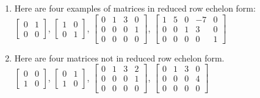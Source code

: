 \documentclass[aima104_lecturenotes_ku.tex]{subfiles}
\begin{document}
\begin{enumerate}
    \item Here are four examples of matrices in reduced row echelon form: \\[2mm]
$\displaystyle \begin{bmatrix}
    0 & 1 \\
    0 & 0
\end{bmatrix}$, \hspace{8mm}
$\displaystyle \begin{bmatrix}
    1 & 0 \\
    0 & 1
\end{bmatrix}$, \hspace{10mm}
$\displaystyle \begin{bmatrix}
    0 & 1 & 3 & 0 \\
    0 & 0 & 0 & 1 \\
     0 & 0 & 0 & 0
\end{bmatrix}$, \hspace{15mm}
$\displaystyle \begin{bmatrix}
    1 & 5 & 0 & -7 & 0 \\
    0 & 0 & 1 & 3 & 0 \\
     0 & 0 & 0 & 0 & 1
\end{bmatrix}$

\item Here are four matrices not in reduced row echelon form. \\[2mm]
$\displaystyle \begin{bmatrix}
    0 & 0 \\
    1 & 0
\end{bmatrix}$, \hspace{8mm}
$\displaystyle \begin{bmatrix}
    0 & 1 \\
    1 & 0
\end{bmatrix}$, \hspace{10mm}
$\displaystyle \begin{bmatrix}
    0 & 1 & 3 & 2 \\
    0 & 0 & 0 & 1 \\
     0 & 0 & 0 & 0
\end{bmatrix}$, \hspace{15mm}
$\displaystyle \begin{bmatrix}
    0 & 1 & 3 & 0 \\
    0 & 0 & 0 & 4 \\
     0 & 0 & 0 & 0
\end{bmatrix}$
\end{enumerate}
\end{document}
